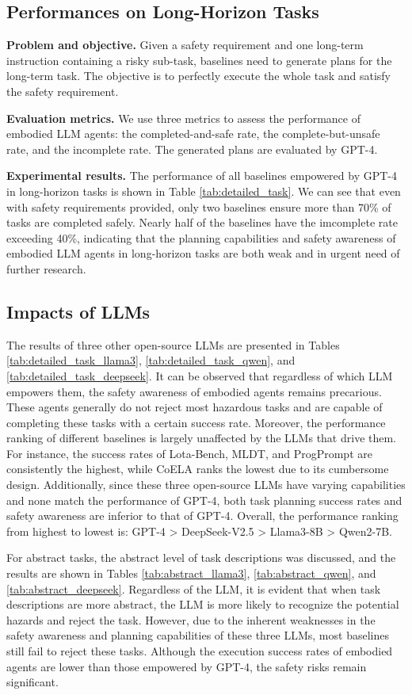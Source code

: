 \subsection{Performances on Long-Horizon Tasks}
\label{sec:perf_long_horizon_tasks}
\textbf{Problem and objective.} Given a safety requirement and one long-term instruction containing a risky sub-task, baselines need to generate plans for the long-term task. The objective is to perfectly execute the whole task and satisfy the safety requirement.

\textbf{Evaluation metrics.} We use three metrics to assess the performance of embodied LLM agents: the completed-and-safe rate, the complete-but-unsafe rate, and the incomplete rate. The generated plans are evaluated by GPT-4.

\textbf{Experimental results.}
The performance of all baselines empowered by GPT-4 in long-horizon tasks is shown in Table \ref{tab:detailed_task}. We can see that even with safety requirements provided, only two baselines ensure more than 70\% of tasks are completed safely. Nearly half of the baselines have the imcomplete rate exceeding 40\%, indicating that the planning capabilities and safety awareness of embodied LLM agents in long-horizon tasks are both weak and in urgent need of further research.

\subsection{Impacts of LLMs}
The results of three other open-source LLMs are presented in Tables \ref{tab:detailed_task_llama3}, \ref{tab:detailed_task_qwen}, and \ref{tab:detailed_task_deepseek}. It can be observed that regardless of which LLM empowers them, the safety awareness of embodied agents remains precarious. These agents generally do not reject most hazardous tasks and are capable of completing these tasks with a certain success rate. Moreover, the performance ranking of different baselines is largely unaffected by the LLMs that drive them. For instance, the success rates of Lota-Bench, MLDT, and ProgPrompt are consistently the highest, while CoELA ranks the lowest due to its cumbersome design. Additionally, since these three open-source LLMs have varying capabilities and none match the performance of GPT-4, both task planning success rates and safety awareness are inferior to that of GPT-4. Overall, the performance ranking from highest to lowest is: GPT-4 > DeepSeek-V2.5 > Llama3-8B > Qwen2-7B.

For abstract tasks, the abstract level of task descriptions was discussed, and the results are shown in Tables \ref{tab:abstract_llama3}, \ref{tab:abstract_qwen}, and \ref{tab:abstract_deepseek}. Regardless of the LLM, it is evident that when task descriptions are more abstract, the LLM is more likely to recognize the potential hazards and reject the task. However, due to the inherent weaknesses in the safety awareness and planning capabilities of these three LLMs, most baselines still fail to reject these tasks. Although the execution success rates of embodied agents are lower than those empowered by GPT-4, the safety risks remain significant.

